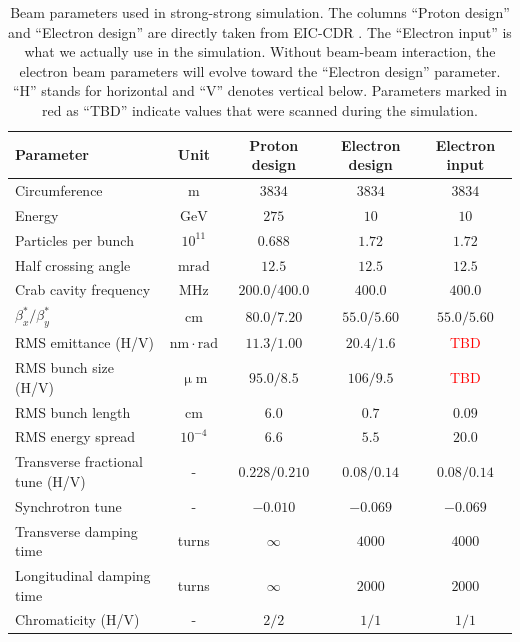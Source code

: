 \documentclass{article}
\begin{document}
\begin{table}
  \centering
  \caption{Beam parameters used in strong-strong simulation. The columns ``Proton 
  design'' and ``Electron design'' are directly taken from EIC-CDR 
  \cite{willeke2021electron}. The ``Electron input'' is what we actually use in
  the simulation. Without beam-beam interaction, the electron beam parameters
  will evolve toward the ``Electron design'' parameter.
  ``H'' stands for horizontal and ``V'' denotes vertical below.
  Parameters marked in red as ``TBD'' indicate values that were scanned during 
  the simulation.\\}
  \begin{tabular}{lcccc}
   \toprule
    Parameter & Unit & Proton design & Electron design & Electron input\\
    \hline
    Circumference & $\mathrm{m}$ & $3834$ & $3834$ & $3834$ \\
    Energy & $\mathrm{GeV}$ & $275$ & $10$ & $10$\\
    Particles per bunch & $10^{11}$ & $0.688$ & $1.72$ & $1.72$\\
    Half crossing angle & $\mathrm{mrad}$ & $12.5$ & $12.5$ & $12.5$\\
    Crab cavity frequency & $\mathrm{MHz}$ & $200.0/400.0$ & $400.0$ & $400.0$\\
    $\beta_x^*/\beta_y^*$ & $\mathrm{cm}$ & $80.0/7.20$ & $55.0/5.60$ & $55.0/5.60$\\
    RMS emittance (H/V) & $\mathrm{nm\cdot rad}$ & $11.3/1.00$ & $20.4/1.6$ & \textcolor{red}{TBD}\\
    RMS bunch size (H/V) & $\mathrm{\upmu m}$ & $95.0/8.5$ & $106/9.5$ & \textcolor{red}{TBD}\\
    RMS bunch length & $\mathrm{cm}$ & $6.0$ & $0.7$ & $0.09$\\
    RMS energy spread & $10^{-4}$ & $6.6$ & $5.5$ & $20.0$\\
    Transverse fractional tune (H/V) & - & $0.228/0.210$ & $0.08/0.14$ & $0.08/0.14$\\
    Synchrotron tune  & - & $-0.010$ & $-0.069$ & $-0.069$\\
    Transverse damping time & turns & $\infty$ & $4000$ & $4000$\\
    Longitudinal damping time & turns & $\infty$ & $2000$ & $2000$\\
    Chromaticity (H/V) & - & $2/2$ & $1/1$ & $1/1$\\
  \bottomrule
  \end{tabular}
  \label{tab:SimulationParameters}
\end{table}
\end{document}
